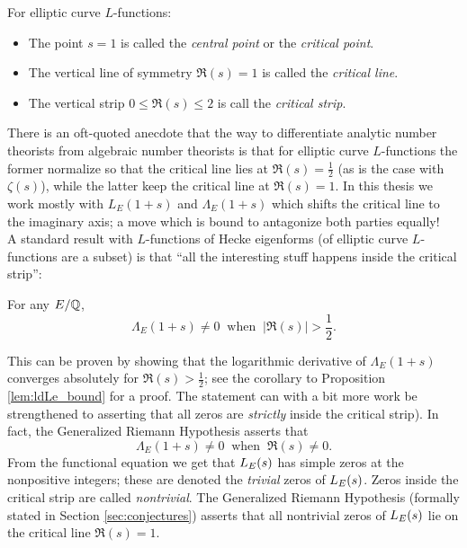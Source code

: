 \begin{definition} For elliptic curve $L$-functions:
\begin{itemize}
\item The point $s=1$ is called the {\it central point} or the {\it critical point}.
\item The vertical line of symmetry $\Re(s)=1$ is called the {\it critical line}.
\item The vertical strip $0 \le \Re(s) \le 2$ is call the {\it critical strip}.
\end{itemize}
\end{definition}

There is an oft-quoted anecdote that the way to differentiate analytic number theorists from algebraic number theorists is that for elliptic curve $L$-functions the former normalize so that the critical line lies at $\Re(s) = \frac{1}{2}$ (as is the case with $\zeta(s)$), while the latter keep the critical line at $\Re(s)=1$. In this thesis we work mostly with $L_E(1+s)$ and $\Lambda_E(1+s)$ which shifts the critical line to the imaginary axis; a move which is bound to antagonize both parties equally! \\

A standard result with $L$-functions of Hecke eigenforms (of elliptic curve $L$-functions are a subset) is that ``all the interesting stuff happens inside the critical strip'':
\begin{proposition}
For any $E/\mathbb{Q}$,
\begin{equation}
\Lambda_E(1+s) \ne 0 \;\;\mbox{when}\;\; |\Re(s)| > \frac{1}{2}.
\end{equation}
\end{proposition}
This can be proven by showing that the logarithmic derivative of $\Lambda_E(1+s)$ converges absolutely for $\Re(s) > \frac{1}{2}$; see the corollary to Proposition \ref{lem:ldLe_bound} for a proof. The statement can with a bit more work be strengthened to asserting that all zeros are {\it strictly} inside the critical strip). In fact, the Generalized Riemann Hypothesis asserts that
\begin{equation}
\Lambda_E(1+s) \ne 0  \;\;\mbox{when}\;\; \Re(s) \neq 0.
\end{equation}
From the functional equation we get that $L_E(s)$ has simple zeros at the nonpositive integers; these are denoted the {\it trivial} zeros of $L_E(s)$. Zeros inside the critical strip are called {\it nontrivial}. The Generalized Riemann Hypothesis (formally stated in Section \ref{sec:conjectures}) asserts that all nontrivial zeros of $L_E(s)$ lie on the critical line $\Re(s)=1$. 

